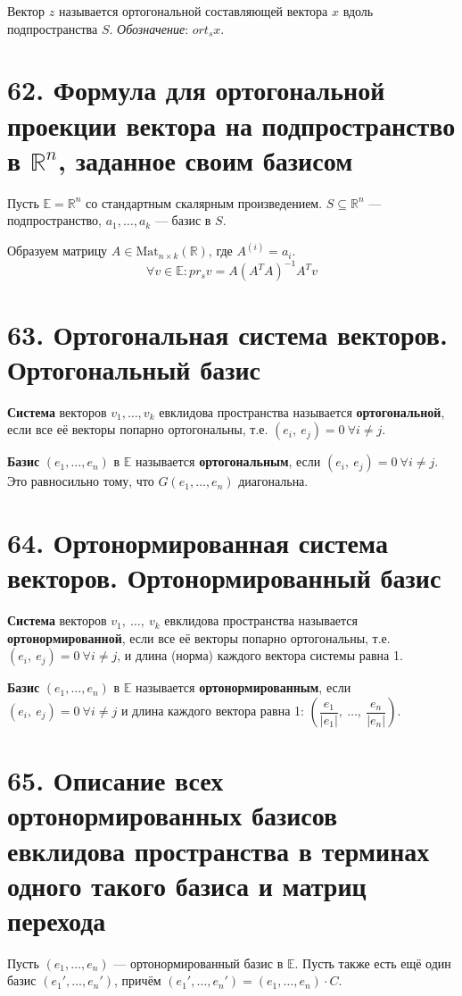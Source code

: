 \documentclass[a4paper, 12pt]{article}
\newcommand{\E}{\mathbb{E}}
\newcommand{\R}{\mathbb{R}}
\begin{document}
Вектор $z$ называется ортогональной составляющей вектора $x$ вдоль подпространства $S$. \textit{Обозначение}: $ort_sx$.

\section*{62. Формула для ортогональной проекции вектора на подпространство в $\R^n$, заданное своим базисом}
Пусть $\E = \R^n$ со стандартным скалярным произведением. $S \subseteq \R^n$ --- подпространство, $a_1, \ldots, a_k$ --- базис в $S$.

Образуем матрицу $A \in \text{Mat}_{n \times k}(\R)$, где $A^{(i)} = a_i$.
\[
\forall v \in \E: pr_sv = A(A^TA)^{-1}A^Tv
\]

\section*{63. Ортогональная система векторов. Ортогональный базис}
\textbf{Система} векторов $v_1, \ldots, v_k$ евклидова пространства называется \textbf{ортогональной}, если все её векторы попарно ортогональны, т.е. $(e_i,\ e_j) = 0\ \forall i \neq j$.

\textbf{Базис} $(e_1, \ldots, e_n)$ в $\E$ называется \textbf{ортогональным}, если $(e_i,\ e_j) = 0\ \forall i \neq j$. Это равносильно тому, что $G(e_1, \ldots, e_n)$ диагональна.

\section*{64. Ортонормированная система векторов. Ортонормированный базис}
\textbf{Система} векторов $v_1,\ \ldots,\ v_k$ евклидова пространства называется \textbf{ортонормированной}, если все её векторы попарно ортогональны, т.е. $(e_i,\ e_j) = 0\ \forall i \neq j$, и длина (норма) каждого вектора системы равна 1.

\textbf{Базис} $(e_1, \ldots, e_n)$ в $\E$ называется \textbf{ортонормированным}, если $(e_i,\ e_j) = 0\ \forall i \neq j$ и длина каждого вектора равна 1: 
$\left(
\dfrac{e_1}{|e_1|},\ \ldots,\ \dfrac{e_n}{|e_n|}
\right)$.

\section*{65. Описание всех ортонормированных базисов евклидова пространства в терминах одного такого базиса и матриц перехода}
Пусть $(e_1, \ldots, e_n)$ --- ортонормированный базис в $\E$. Пусть также есть ещё один базис $(e_1', \ldots, e_n')$, причём $(e_1', \ldots, e_n') = (e_1, \ldots, e_n) \cdot C$.
\end{document}
